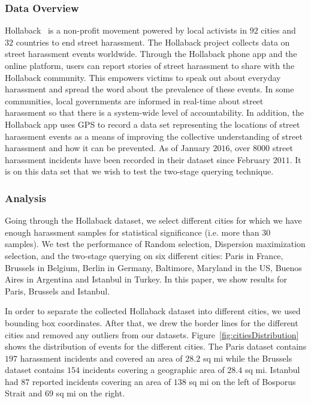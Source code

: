 \documentclass{acm_proc_article-sp}
\begin{document}
\subsubsection{Data Overview}
Hollaback~\cite{hollaback} is a non-profit movement powered by local activists in $92$ cities and $32$ countries to end street harassment. The Hollaback project collects data on street harassment events worldwide. Through the Hollaback phone app and the online platform, users can report stories of street harassment to share with the Hollaback community. This empowers victims to speak out about everyday harassment and spread the word about the prevalence of these events. In some communities, local governments are informed in real-time about street harassment so that there is a system-wide level of accountability. In addition, the Hollaback app uses GPS to record a data set representing the locations of street harassment events as a means of improving the collective understanding of street harassment and how it can be prevented.  As of January $2016$, over $8000$ street harassment incidents have been recorded in their dataset since February $2011$.  It is on this data set that we wish to test the two-stage querying technique.\par
\subsubsection{Analysis}
Going through the Hollaback dataset, we select different cities for which we have enough harassment samples for statistical significance (i.e. more than 30 samples). We test the performance of Random selection, Dispersion maximization selection, and the two-stage querying on six different cities: Paris in France, Brussels in Belgium, Berlin in Germany, Baltimore, Maryland in the US, Buenos Aires in Argentina and Istanbul in Turkey. In this paper, we show results for Paris, Brussels and Istanbul. \par

In order to separate the collected Hollaback dataset into different cities, we used bounding box coordinates. After that, we drew the border lines for the different cities and removed any outliers from our datasets. Figure~\ref{fig:citiesDistribution} shows the distribution of events for the different cities. The Paris dataset contains $197$ harassment incidents and covered an area of $28.2$ sq mi while the Brussels dataset contains $154$ incidents covering a geographic area of $28.4$ sq mi. Istanbul had $87$ reported incidents covering an area of $138$ sq mi on the left of Bosporus Strait and $69$ sq mi on the right. \par
\end{document}
